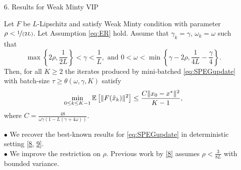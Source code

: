 \documentclass[24pt,final]{beamer}
\newlength{\sepwid}
\newlength{\onecolwid}
\newlength{\twocolwid}
\begin{document}
\begin{frame}[t]
\begin{columns}[t]
\begin{column}{\twocolwid}
\begin{columns}[t,totalwidth=\twocolwid]
\begin{column}{\onecolwid}
\begin{block}{6. Results for Weak Minty VIP} 
\begin{tcolorbox}[colback=green!5!white,colframe=green!50!black,title={Theorem}]
Let $F$ be $L$-Lipschitz and satisfy Weak Minty condition with parameter $\rho < \nicefrac{1}{(2L)}$. Let Assumption \ref{eq:ER} hold. Assume that $\gamma_k = \gamma$, $\omega_k = \omega$ such that $$\max\left\{2\rho, \frac{1}{2L}\right\} < \gamma < \frac{1}{L},\text{  and  } 0 < \omega < \min\left\{\gamma - 2\rho, \frac{1}{4L} - \frac{\gamma}{4}\right\}.$$
    Then, for all $K \geq 2$ the iterates produced by mini-batched \ref{eq:SPEGupdate} with batch-size $\tau \geq \theta(\omega, \gamma, K)$ satisfy
    \begin{eqnarray*}
        \min\limits_{0\leq k \leq K-1}\mathbb{E}\left[ \|F(\hat x_k)\|^2\right] \leq \frac{C\|x_0 - x^*\|^2}{K-1},
    \end{eqnarray*}
where $C = \frac{48}{\omega\gamma (1 - L(\gamma + 4\omega))}$.
\end{tcolorbox}
 $\bullet$ We recover the best-known results for \ref{eq:SPEGupdate} in deterministic setting [\href{https://arxiv.org/pdf/2201.12247.pdf}{8}, \href{https://proceedings.mlr.press/v202/gorbunov23a/gorbunov23a.pdf}{9}]. \\
	$\bullet$ We improve the restriction on $\rho$. Previous work by \href{https://arxiv.org/pdf/2201.12247.pdf}{[8]} assumes $\rho < \frac{3}{8L}$ with bounded variance.
 \end{block}
		\end{column} %

		
		
		
		
		
		
            
		\begin{column}{\onecolwid} %
  

\end{column}
\end{columns}
\end{column}
\end{columns}
\end{frame}
\end{document}
